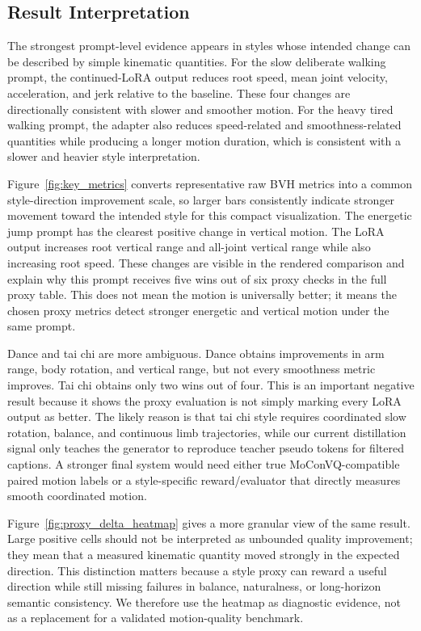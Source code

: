 \documentclass[conference]{IEEEtran}
\begin{document}
\subsection{Result Interpretation}
The strongest prompt-level evidence appears in styles whose intended change can be described by simple kinematic quantities. For the slow deliberate walking prompt, the continued-LoRA output reduces root speed, mean joint velocity, acceleration, and jerk relative to the baseline. These four changes are directionally consistent with slower and smoother motion. For the heavy tired walking prompt, the adapter also reduces speed-related and smoothness-related quantities while producing a longer motion duration, which is consistent with a slower and heavier style interpretation.

Figure~\ref{fig:key_metrics} converts representative raw BVH metrics into a common style-direction improvement scale, so larger bars consistently indicate stronger movement toward the intended style for this compact visualization. The energetic jump prompt has the clearest positive change in vertical motion. The LoRA output increases root vertical range and all-joint vertical range while also increasing root speed. These changes are visible in the rendered comparison and explain why this prompt receives five wins out of six proxy checks in the full proxy table. This does not mean the motion is universally better; it means the chosen proxy metrics detect stronger energetic and vertical motion under the same prompt.

Dance and tai chi are more ambiguous. Dance obtains improvements in arm range, body rotation, and vertical range, but not every smoothness metric improves. Tai chi obtains only two wins out of four. This is an important negative result because it shows the proxy evaluation is not simply marking every LoRA output as better. The likely reason is that tai chi style requires coordinated slow rotation, balance, and continuous limb trajectories, while our current distillation signal only teaches the generator to reproduce teacher pseudo tokens for filtered captions. A stronger final system would need either true MoConVQ-compatible paired motion labels or a style-specific reward/evaluator that directly measures smooth coordinated motion.

Figure~\ref{fig:proxy_delta_heatmap} gives a more granular view of the same result. Large positive cells should not be interpreted as unbounded quality improvement; they mean that a measured kinematic quantity moved strongly in the expected direction. This distinction matters because a style proxy can reward a useful direction while still missing failures in balance, naturalness, or long-horizon semantic consistency. We therefore use the heatmap as diagnostic evidence, not as a replacement for a validated motion-quality benchmark.
\end{document}
